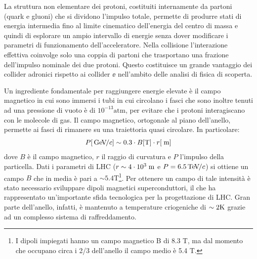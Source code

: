 La struttura non elementare dei protoni, costituiti internamente da partoni (quark e gluoni) che si dividono l'impulso totale, permette di produrre stati di energia intermedia fino al limite cinematico dell'energia del centro di massa e quindi di esplorare un ampio intervallo di energie senza dover modificare i parametri di funzionamento dell'acceleratore. Nella collisione l'interazione effettiva coinvolge solo una coppia di partoni che trasportano una frazione dell'impulso nominale dei due protoni. Questo costituisce un grande vantaggio dei collider adronici rispetto ai collider $\ee$ nell'ambito delle analisi di fisica di scoperta.


Un ingrediente fondamentale per raggiungere energie elevate \`e il campo magnetico in cui sono immersi i tubi in cui circolano i fasci che sono inoltre tenuti ad una pressione di vuoto è di $10^{-13}{\mathrm{atm}}$, per evitare che i protoni interagiscano con le molecole di gas. Il campo magnetico, ortogonale al piano dell'anello, permette ai fasci di rimanere su una traiettoria quasi circolare. In particolare:
\begin{equation}
P[{\rm \, Ge\kern-0.125em V}\kern-0.125em /c] \sim 0.3 \cdot B[{\mathrm T}] \cdot r[\rm \; m]
\end{equation}
dove $B$ è il campo magnetico, $r$ il raggio di curvatura e $P$ l'impulso della particella. Dati i parametri di LHC ($r\sim4 \cdot 10^3\rm \; m$ e $P=6.5{\rm \, Te\kern-0.125em V}\kern-0.125em /c$) si ottiene un campo $B$ che in media è pari a $\sim 5.4{\mathrm T}$\footnote{I dipoli impiegati hanno un campo magnetico B di 8.3 T, ma dal momento che occupano circa i 2/3 dell'anello il campo medio è 5.4 T.}. Per ottenere un campo di tale intensit\`a è stato necessario sviluppare dipoli magnetici superconduttori, il che ha rappresentato un'importante sfida tecnologica per la progettazione di LHC. Gran parte dell'anello, infatti, \`e mantenuto a temperature criogeniche di $\sim 2{\mathrm K}$ grazie ad un complesso sistema di raffreddamento.

